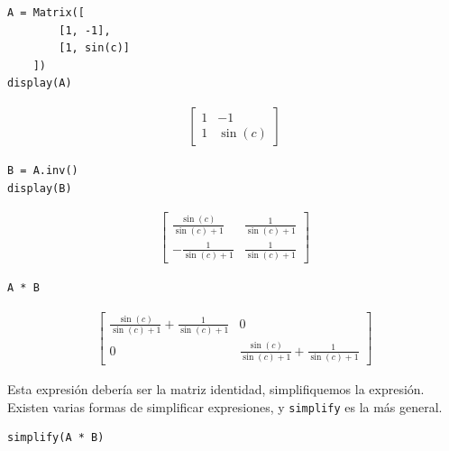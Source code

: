 \begin{listing}[H]
\begin{verbatim}
A = Matrix([
        [1, -1],
        [1, sin(c)]
    ])
display(A)
\end{verbatim}
\end{listing}

\[\begin{aligned}
\left[\begin{matrix}1 & -1\\1 & \sin{\left (c \right )}\end{matrix}\right]
\end{aligned}\]

\begin{listing}[H]
\begin{verbatim}
B = A.inv()
display(B)
\end{verbatim}
\end{listing}

\[\begin{aligned}
\left[\begin{matrix}\frac{\sin{\left (c \right )}}{\sin{\left (c \right )} + 1} & \frac{1}{\sin{\left (c \right )} + 1}\\- \frac{1}{\sin{\left (c \right )} + 1} & \frac{1}{\sin{\left (c \right )} + 1}\end{matrix}\right]
\end{aligned}\]

\begin{listing}[H]
\begin{verbatim}
A * B
\end{verbatim}
\end{listing}

\[\begin{aligned}
\left[\begin{matrix}\frac{\sin{\left (c \right )}}{\sin{\left (c \right )} + 1} + \frac{1}{\sin{\left (c \right )} + 1} & 0\\0 & \frac{\sin{\left (c \right )}}{\sin{\left (c \right )} + 1} + \frac{1}{\sin{\left (c \right )} + 1}\end{matrix}\right]
\end{aligned}\]

Esta expresión debería ser la matriz identidad, simplifiquemos la
expresión. Existen varias formas de simplificar expresiones, y
\texttt{simplify} es la más general.

\begin{listing}[H]
\begin{verbatim}
simplify(A * B)
\end{verbatim}
\end{listing}

